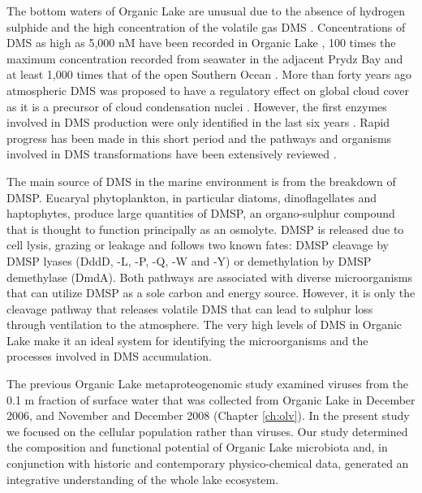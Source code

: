 The bottom waters of Organic Lake are unusual due to the absence of hydrogen sulphide and the high concentration of the volatile gas \ac{DMS} \cite{Deprez1986, Franzmann1987b, Gibson1991, Roberts1993a, Roberts1993b}. 
Concentrations of \ac{DMS} as high as 5,000 nM have been recorded in Organic Lake \cite{Gibson1991}, 100 times the maximum concentration recorded from seawater in the adjacent Prydz Bay and at least 1,000 times that of the open Southern Ocean \cite{Curran1998}.
More than forty years ago atmospheric \ac{DMS} was proposed to have a regulatory effect on global cloud cover as it is a precursor of cloud condensation nuclei \cite{Lovelock1972, Charlson1987}.
However, the first enzymes involved in \ac{DMS} production were only identified in the last six years \cite{Todd2007}.
Rapid progress has been made in this short period and the pathways and organisms involved in \ac{DMS} transformations have been extensively reviewed \cite{Johnston2008, Schafer2010, Curson2011b, Reisch2011b, Moran2012}. 

The main source of \ac{DMS} in the marine environment is from the breakdown of \ac{DMSP}. 
Eucaryal phytoplankton, in particular diatoms, dinoflagellates and haptophytes, produce large quantities of \ac{DMSP}, an organo-sulphur compound that is thought to function principally as an osmolyte. 
\ac{DMSP} is released due to cell lysis, grazing or leakage and follows two known fates: \ac{DMSP} cleavage by \ac{DMSP} lyases (DddD, -L, -P, -Q, -W and -Y) or demethylation by \ac{DMSP} demethylase (DmdA).
 Both pathways are associated with diverse microorganisms that can utilize \ac{DMSP} as a sole carbon and energy source. 
However, it is only the cleavage pathway that releases volatile \ac{DMS} that can lead to sulphur loss through ventilation to the atmosphere.
The very high levels of \ac{DMS} in Organic Lake make it an ideal system for identifying the microorganisms and the processes involved in \ac{DMS} accumulation. 

The previous Organic Lake metaproteogenomic study examined viruses from the 0.1 \textmu{}m fraction of surface water that was collected from Organic Lake in December 2006, and November and December 2008 \cite{Yau2011} (Chapter \ref{ch:olv}). 
In the present study we focused on the cellular population rather than viruses. 
Our study determined the composition and functional potential of Organic Lake microbiota and, in conjunction with historic and contemporary physico-chemical data, generated an integrative understanding of the whole lake ecosystem. 

